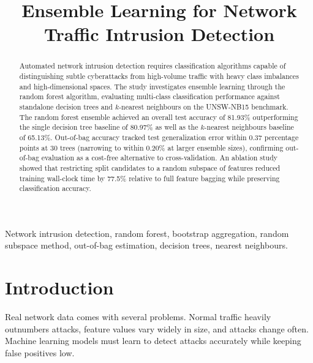\documentclass[conference,10pt]{IEEEtran}
\begin{document}
\title{Ensemble Learning for Network Traffic Intrusion Detection}

\author{
}

\maketitle

\begin{abstract}
Automated network intrusion detection requires classification algorithms capable of distinguishing subtle cyberattacks from high-volume traffic with heavy class imbalances and high-dimensional spaces. The study investigates ensemble learning through the random forest algorithm, evaluating multi-class classification performance against standalone decision trees and $k$-nearest neighbours on the UNSW-NB15 benchmark. The random forest ensemble achieved an overall test accuracy of 81.93\% outperforming the single decision tree baseline of 80.97\% as well as the $k$-nearest neighbours baseline of 65.13\%. Out-of-bag accuracy tracked test generalization error within 0.37 percentage points at 30 trees (narrowing to within 0.20\% at larger ensemble sizes), confirming out-of-bag evaluation as a cost-free alternative to cross-validation. An ablation study showed that restricting split candidates to a random subspace of features reduced training wall-clock time by 77.5\% relative to full feature bagging while preserving classification accuracy.
\end{abstract}

\begin{IEEEkeywords}
Network intrusion detection, random forest, bootstrap aggregation, random subspace method, out-of-bag estimation, decision trees, nearest neighbours.
\end{IEEEkeywords}

\section{Introduction}

Real network data comes with several problems. Normal traffic heavily outnumbers attacks, feature values vary widely in size, and attacks change often. Machine learning models must learn to detect attacks accurately while keeping false positives low.
\end{document}
